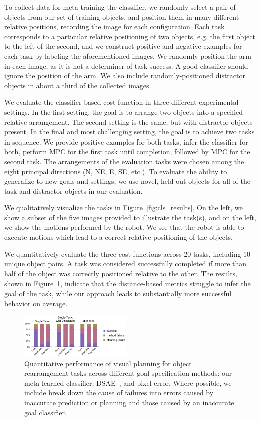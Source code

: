 To collect data for meta-training the classifier, we randomly select a pair of objects from our set of training objects, and position them in many different relative positions, recording the image for each configuration. Each task corresponds to a particular relative positioning of two objects, e.g. the first object to the left of the second, and we construct positive and negative examples for each task by labeling the aforementioned images. We randomly position the arm in each image, as it is not a determiner of task success. A good classifier should ignore the position of the arm. We also include randomly-positioned distractor objects in about a third of the collected images.

We evaluate the classifier-based cost function in three different experimental settings. In the first setting, the goal is to arrange two objects into a specified relative arrangement. The second setting is the same, but with distractor objects present. In the final and most challenging setting, the goal is to achieve two tasks in sequence. We provide positive examples for both tasks, infer the classifier for both, perform MPC for the first task until completion, followed by MPC for the second task. The arrangements of the evaluation tasks were chosen among the eight principal directions (N, NE, E, SE, etc.). To evaluate the ability to generalize to new goals and settings, we use novel, held-out objects for all of the task and distractor objects in our evaluation.

We qualitatively visualize the tasks in Figure~\ref{fig:cls_results}. On the left, we show a subset of the five images provided to illustrate the task(s), and on the left, we show the motions performed by the robot. We see that the robot is able to execute motions which lead to a correct relative positioning of the objects.

We quantitatively evaluate the three cost functions across 20 tasks, including $10$ unique object pairs. A task was considered successfully completed if more than half of the object was correctly positioned relative to the other. The results, shown in Figure~\ref{fig:cls_charts}, indicate that the distance-based metrics struggle to infer the goal of the task, while our approach leads to substantially more successful behavior on average.

\begin{figure}
    \centering
    \includegraphics[width=0.48\textwidth]{images_cls/cls_charts_2.jpeg}
    \caption{\small Quantitative performance of visual planning for object rearrangement tasks across different goal specification methods: our meta-learned classifier, DSAE~\cite{dsae}, and pixel error. Where possible, we include break down the cause of failures into errors caused by inaccurate prediction or planning and those caused by an inaccurate goal classifier.}
    \label{fig:cls_charts}
    \vspace{-0.3cm}
\end{figure}


